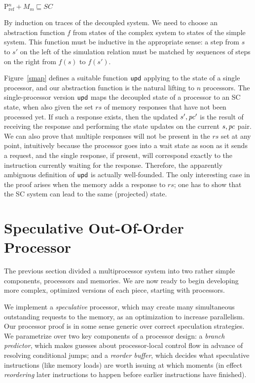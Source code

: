 \begin{theorem}
$\text{P$^n_{\text{ref}}$} + M_m \sqsubseteq SC$\label{scthm}
\end{theorem}
\begin{prf}
\vspace{-.1cm}
By induction on traces of the decoupled system.  We need to choose an
abstraction function $f$ from states of the complex system to states of
the simple system.  This function must be inductive in the
appropriate sense: a step from $s$ to $s'$ on the left of the
simulation relation must be matched by sequences of steps on the right
from $f(s)$ to $f(s')$.

Figure~\ref{smap} defines a suitable function $\mathsf{upd}$ applying to the
state of a single processor, and our abstraction function is the
natural lifting to $n$ processors.
The single-processor version $\mathsf{upd}$ maps
the decoupled state of a processor to an SC state, when also given the
set $rs$ of memory responses that have not been processed yet. If such a
response exists, then the updated $s', \mathit{pc}'$ is the result of
receiving the response and performing the state updates on the current $s,
\mathit{pc}$ pair.  We can also prove that multiple responses will not be present in
the $rs$ set at any point, intuitively because the processor goes into a wait
state as soon as it sends a request, and the single response, if present, will
correspond exactly to the instruction currently waiting for the response.
Therefore, the apparently ambiguous definition of $\mathsf{upd}$ is actually
well-founded.  The only interesting case in the proof arises when the memory adds a
response to $rs$; one has to show that the SC system can lead to the same
(projected) state.
\end{prf}

\section{Speculative Out-Of-Order Processor}\label{sec:ooo}

The previous section divided a multiprocessor system into two rather
simple components, processors and memories.  We are now ready to begin
developing more complex, optimized versions of each piece, starting
with processors.

We implement a \emph{speculative} processor, which may create many
simultaneous outstanding requests to the memory, as an optimization to
increase parallelism.  Our processor proof is in some sense generic
over correct speculation strategies.  We parametrize over two key
components of a processor design: a \emph{branch predictor}, which
makes guesses about processor-local control flow in advance of
resolving conditional jumps; and a
\emph{reorder buffer}, which decides what speculative instructions (like memory loads)
are worth issuing at which moments (in effect \emph{reordering} later
instructions to happen before earlier instructions have finished).


